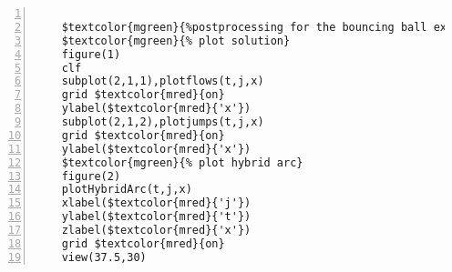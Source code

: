%  
%  
%  
%  
  
  
\DefineShortVerb[fontfamily=courier,fontseries=m]{\$} 
\DefineShortVerb[fontfamily=courier,fontseries=b]{\#} 
  
\begin{Verbatim}[commandchars=\$\{\},numbers=left,numbersep=2pt] 

    $textcolor{mgreen}{%postprocessing for the bouncing ball example} 
    $textcolor{mgreen}{% plot solution} 
    figure(1) 
    clf 
    subplot(2,1,1),plotflows(t,j,x) 
    grid $textcolor{mred}{on} 
    ylabel($textcolor{mred}{'x'}) 
    subplot(2,1,2),plotjumps(t,j,x) 
    grid $textcolor{mred}{on} 
    ylabel($textcolor{mred}{'x'}) 
    $textcolor{mgreen}{% plot hybrid arc} 
    figure(2) 
    plotHybridArc(t,j,x) 
    xlabel($textcolor{mred}{'j'}) 
    ylabel($textcolor{mred}{'t'}) 
    zlabel($textcolor{mred}{'x'}) 
    grid $textcolor{mred}{on} 
    view(37.5,30)  
\end{Verbatim}  
  
\UndefineShortVerb{\$} 
\UndefineShortVerb{\#} 
 